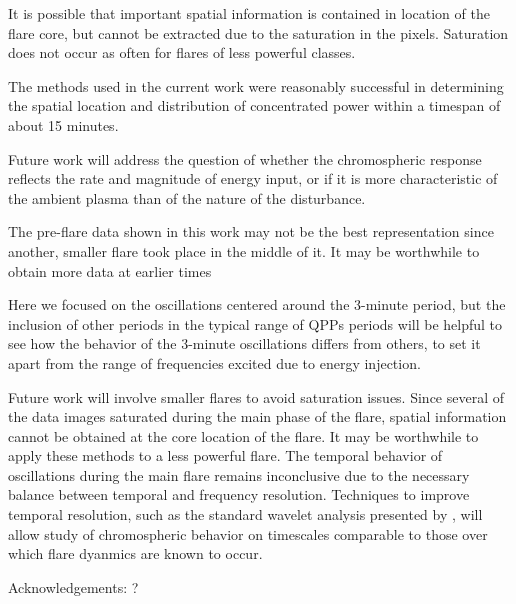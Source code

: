 It is possible that important spatial information is contained
in location of the flare core,
but cannot be extracted due to the saturation in the pixels.
Saturation does not occur as often for flares
of less powerful classes.

The methods used in the current work were reasonably
successful in determining the spatial location and distribution
of concentrated power within a timespan of about 15 minutes.

Future work will address the question of whether the chromospheric response
reflects the rate and magnitude of energy input, or if it is more
characteristic of the ambient plasma than of the nature of the disturbance.

The pre-flare data shown in this work may not be the best representation
since another, smaller flare took place in the middle of it.
It may be worthwhile to obtain more data at earlier times


Here we focused on the oscillations centered around the 3-minute period,
but the inclusion of other periods in the typical range of QPPs periods
will be helpful to see how the behavior of the 3-minute oscillations differs
from others, to set it apart from the range of frequencies excited due
to energy injection.



Future work will involve smaller flares to avoid saturation issues.
Since several of the data images saturated during the main phase of the flare,
spatial information cannot be obtained at the core location of the flare.
It may be worthwhile to apply these methods to a less powerful flare.
The temporal behavior of oscillations during the main flare remains
inconclusive due to the necessary balance between temporal and frequency
resolution.
Techniques to improve temporal resolution,
such as the standard wavelet analysis
presented by \cite{Torrence1998},
will allow study of chromospheric behavior on timescales comparable to those
over which flare dyanmics are known to occur.

Acknowledgements: ?
